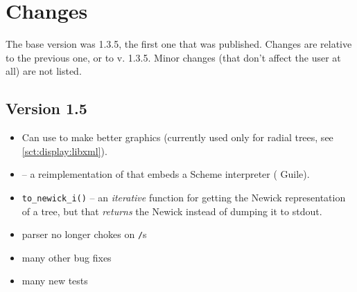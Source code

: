 \chapter{Changes}

The base version was 1.3.5, the first one that was published. Changes are
relative to the previous one, or to v. 1.3.5. Minor changes (that don't affect
the user at all) are not listed.

\section{Version 1.5}

\begin{itemize}
\item Can use \libxml{} to make better graphics (currently used only for radial
trees, see \ref{sct:display:libxml}).
\item \sched{}-- a reimplementation of \ed{} that embeds a Scheme interpreter
(\gnu{} Guile).
\item \texttt{to\_newick\_i()} -- an \emph{iterative} function for getting the
Newick representation of a tree, but that \emph{returns} the Newick instead of dumping it to stdout.
\item parser no longer chokes on \texttt{/}s
\item many other bug fixes
\item many new tests
\end{itemize}
